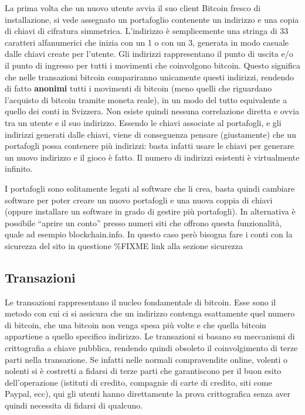 La prima volta che un nuovo utente avvia il suo client Bitcoin fresco di
installazione, si vede assegnato un portafoglio contenente un indirizzo
e una copia di chiavi di cifratura simmetrica. L'indirizzo è
semplicemente una stringa di 33 caratteri alfanumerici che inizia con un
1 o con un 3, generata in modo casuale dalle chiavi create per l'utente.
Gli indirizzi rappresentano il punto di uscita e/o il punto di ingresso
per tutti i movimenti che coinvolgono bitcoin. Questo significa che
nelle transazioni bitcoin compariranno unicamente questi indirizzi,
rendendo di fatto \textbf{anonimi} tutti i movimenti di bitcoin (meno
quelli che riguardano l'acquisto di bitcoin tramite moneta reale), in un
modo del tutto equivalente a quello dei conti in Svizzera. Non esiste
quindi nessuna correlazione diretta e ovvia tra un utente e il suo
indirizzo. Essendo le chiavi associate al portafogli, e gli indirizzi
generati dalle chiavi, viene di conseguenza pensare (giustamente) che un
portafogli possa contenere più indirizzi: basta infatti usare le chiavi
per generare un nuovo indirizzo e il gioco è fatto. Il numero di
indirizzi esistenti è virtualmente infinito.

I portafogli sono solitamente legati al software che li crea, basta
quindi cambiare software per poter creare un nuovo portafogli e una
nuova coppia di chiavi (oppure installare un software in grado di
gestire più portafogli). In alternativa è possibile ``aprire un conto''
presso numeri siti che offrono questa funzionalità, quale ad esempio
blockchain.info. In questo caso però bisogna fare i conti con la
sicurezza del sito in questione \%FIXME link alla sezione sicurezza

\subsection{Transazioni}\label{transazioni}

Le transazioni rappresentano il nucleo fondamentale di bitcoin. Esse
sono il metodo con cui ci si assicura che un indirizzo contenga
esattamente quel numero di bitcoin, che una bitcoin non venga spesa più
volte e che quella bitcoin appartiene a quello specifico indirizzo. Le
transazioni si basano su meccanismi di crittografia a chiave pubblica,
rendendo quindi obsoleto il coinvolgimento di terze parti nella
transazione. Se infatti nelle normali compravendite online, volenti o
nolenti si è costretti a fidarsi di terze parti che garantiscono per il
buon esito dell'operazione (istituti di credito, compagnie di carte di
credito, siti come Paypal, ecc), qui gli utenti hanno direttamente la
prova crittografica senza aver quindi necessita di fidarsi di qualcuno.

